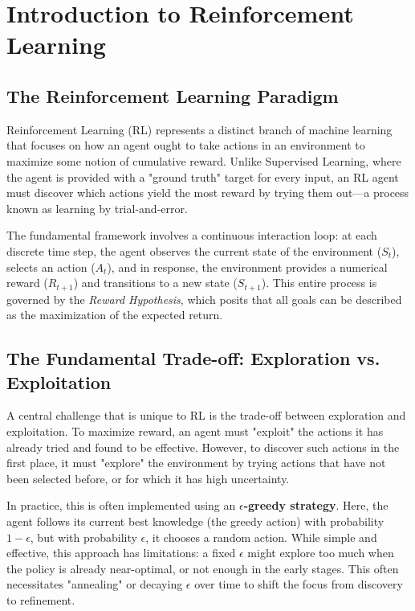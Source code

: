 \section{Introduction to Reinforcement Learning}

\subsection{The Reinforcement Learning Paradigm}
Reinforcement Learning (RL) represents a distinct branch of machine learning that focuses on how an agent ought to take actions in an environment to maximize some notion of cumulative reward. Unlike Supervised Learning, where the agent is provided with a "ground truth" target for every input, an RL agent must discover which actions yield the most reward by trying them out—a process known as learning by trial-and-error.

The fundamental framework involves a continuous interaction loop: at each discrete time step, the agent observes the current state of the environment ($S_t$), selects an action ($A_t$), and in response, the environment provides a numerical reward ($R_{t+1}$) and transitions to a new state ($S_{t+1}$). This entire process is governed by the \textit{Reward Hypothesis}, which posits that all goals can be described as the maximization of the expected return.

\subsection{The Fundamental Trade-off: Exploration vs. Exploitation}
A central challenge that is unique to RL is the trade-off between exploration and exploitation. To maximize reward, an agent must "exploit" the actions it has already tried and found to be effective. However, to discover such actions in the first place, it must "explore" the environment by trying actions that have not been selected before, or for which it has high uncertainty.

In practice, this is often implemented using an \textbf{$\epsilon$-greedy strategy}. Here, the agent follows its current best knowledge (the greedy action) with probability $1-\epsilon$, but with probability $\epsilon$, it chooses a random action. While simple and effective, this approach has limitations: a fixed $\epsilon$ might explore too much when the policy is already near-optimal, or not enough in the early stages. This often necessitates "annealing" or decaying $\epsilon$ over time to shift the focus from discovery to refinement.

